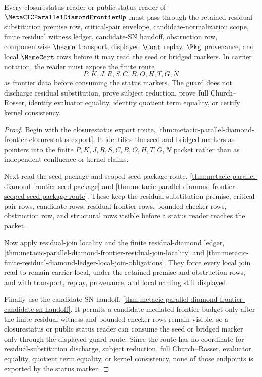 \begin{theorem}
\label{thm:metacic-parallel-diamond-frontier-closurestatus-guard}
Every closurestatus reader or public status reader of $\MetaCICParallelDiamondFrontierUp$ must pass through the retained residual-substitution premise row, critical-pair envelope, candidate-normalization scope, finite residual witness ledger, candidate-SN handoff, obstruction row, componentwise $\hsame$ transport, displayed $\Cont$ replay, $\Pkg$ provenance, and local $\NameCert$ rows before it may read the seed or bridged markers. In carrier notation, the reader must expose the finite route
$$
P,K,J,R,S,C,B,O,H,T,G,N
$$
as frontier data before consuming the status markers. The guard does not discharge residual substitution, prove subject reduction, prove full Church--Rosser, identify evaluator equality, identify quotient term equality, or certify kernel consistency.
\end{theorem}
\begin{proof}
Begin with the closurestatus export route, \autoref{thm:metacic-parallel-diamond-frontier-closurestatus-export}. It identifies the seed and bridged markers as pointers into the finite $P,K,J,R,S,C,B,O,H,T,G,N$ packet rather than as independent confluence or kernel claims.

Next read the seed package and scoped seed package route, \autoref{thm:metacic-parallel-diamond-frontier-seed-package} and \autoref{thm:metacic-parallel-diamond-frontier-scoped-seed-package-route}. These keep the residual-substitution premise, critical-pair rows, candidate rows, residual-frontier rows, bounded checker rows, obstruction row, and structural rows visible before a status reader reaches the packet.

Now apply residual-join locality and the finite residual-diamond ledger, \autoref{thm:metacic-parallel-diamond-frontier-residual-join-locality} and \autoref{thm:metacic-finite-residual-diamond-ledger-local-join-obligations}. They force every local join read to remain carrier-local, under the retained premise and obstruction rows, and with transport, replay, provenance, and local naming still displayed.

Finally use the candidate-SN handoff, \autoref{thm:metacic-parallel-diamond-frontier-candidate-sn-handoff}. It permits a candidate-mediated frontier budget only after the finite residual witness and bounded checker rows remain visible, so a closurestatus or public status reader can consume the seed or bridged marker only through the displayed guard route. Since the route has no coordinate for residual-substitution discharge, subject reduction, full Church--Rosser, evaluator equality, quotient term equality, or kernel consistency, none of those endpoints is exported by the status marker.
\end{proof}
